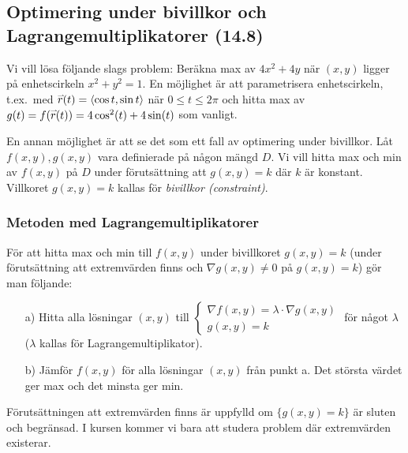 \documentclass[a4paper]{article}
\begin{document}
\subsection{Optimering under bivillkor och Lagrangemultiplikatorer (14.8)}
Vi vill lösa följande slags problem: 
Beräkna max av \(
    4x^2+4y
\) när \(
    (x,y)
\) ligger på enhetscirkeln \(
    x^2+y^2=1
\). En möjlighet är att parametrisera enhetscirkeln, t.ex.\ med \(
    \accentset{\rightharpoonup}{r} (t) = \left\langle \cos t, \sin t \right\rangle
\) när \(
    0 \leq t \leq 2\pi 
\) och hitta max av \(
    g(t) = f(\accentset{\rightharpoonup}{r} (t)) = 4\cos^2(t)+4\sin(t)
\) som vanligt.

En annan möjlighet är att se det som ett fall av optimering under bivillkor.
Låt \(
    f(x,y), g(x,y)
\) vara definierade på någon mängd \(
    D
\). Vi vill hitta max och min av \(
    f(x,y)
\) på \(
    D
\) under förutsättning att \(
    g(x,y) = k
\) där \(
    k
\) är konstant. Villkoret \(
    g(x,y) = k
\) kallas för \emph{bivillkor (constraint)}.

\subsubsection{Metoden med Lagrangemultiplikatorer} 
För att hitta max och min till \(
    f(x,y)
\) under bivillkoret \(
    g(x,y) = k
\) (under förutsättning att extremvärden finns och \(
    \nabla g(x,y) \neq 0
\) på \(
    g(x,y) = k
\)) gör man följande:

\begin{enumerate}
    \item[a)] Hitta alla lösningar \(
        (x,y)
    \) till 
    \(
        \left\{\begin{matrix}
            \nabla f(x,y) = \lambda \cdot \nabla g(x,y) \\ 
            g(x,y) = k
        \end{matrix}\right.
    \) för något \( 
        \lambda
    \) (\(
        \lambda
    \) kallas för Lagrangemultiplikator).

    \item[b)] Jämför \(
        f(x,y)
    \) för alla lösningar \(
        (x,y)
    \) från punkt a. Det största värdet ger max och det minsta ger min.
\end{enumerate}

\begin{anm}
    Förutsättningen att extremvärden finns är uppfylld om \(
        \{g(x,y) = k\} 
    \) är sluten och begränsad. I kursen kommer vi bara att studera problem där
    extremvärden existerar.
\end{anm}
\end{document}
